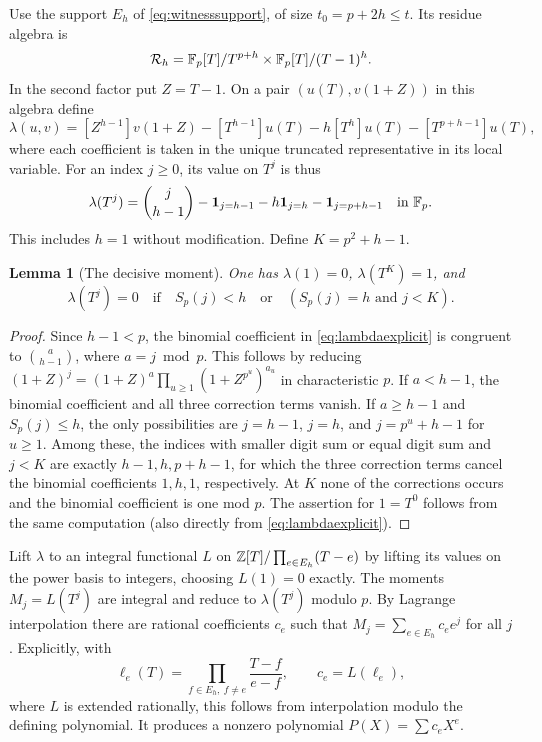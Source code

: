 \documentclass[11pt]{article}
\newtheorem{lemma}[theorem]{Lemma}
\theoremstyle{remark}\newtheorem{remark}[theorem]{Remark}
\begin{document}
Use the support $E_h$ of \eqref{eq:witnesssupport}, of size $t_0=p+2h\le t$.
Its residue algebra is
\[
 \mathcal R_h=\mathbb F_p[T]/T^{p+h}\times\mathbb F_p[T]/(T-1)^h.
\]
In the second factor put $Z=T-1$. On a pair $(u(T),v(1+Z))$ in this algebra define
\begin{equation}\label{eq:lambda}
 \lambda(u,v)=[Z^{h-1}]v(1+Z)-[T^{h-1}]u(T)
 -h[T^h]u(T)-[T^{p+h-1}]u(T),
\end{equation}
where each coefficient is taken in the unique truncated representative in its local
variable. For an index $j\ge0$, its value on $T^j$ is thus
\begin{equation}\label{eq:lambdaexplicit}
 \lambda(T^j)=\binom{j}{h-1}-\mathbf1_{j=h-1}
 -h\mathbf1_{j=h}-\mathbf1_{j=p+h-1}\quad\text{in }\mathbb F_p.
\end{equation}
This includes $h=1$ without modification. Define $K=p^2+h-1$.

\begin{lemma}[The decisive moment]\label{lem:decisive}
One has $\lambda(1)=0$, $\lambda(T^K)=1$, and
\[
 \lambda(T^j)=0\quad\text{if}\quad
 S_p(j)<h\quad\text{or}\quad(S_p(j)=h\text{ and }j<K).
\]
\end{lemma}
\begin{proof}
Since $h-1<p$, the binomial coefficient in \eqref{eq:lambdaexplicit} is congruent
to $\binom{a}{h-1}$, where $a=j\bmod p$. This follows by reducing
$(1+Z)^j=(1+Z)^a\prod_{u\ge1}(1+Z^{p^u})^{a_u}$ in characteristic $p$.
If $a<h-1$, the binomial coefficient and all three correction terms vanish.
If $a\ge h-1$ and $S_p(j)\le h$, the only possibilities are
$j=h-1$, $j=h$, and $j=p^u+h-1$ for $u\ge1$.
Among these, the indices with smaller digit sum or equal digit sum and $j<K$ are
exactly $h-1,h,p+h-1$, for which the three correction terms cancel the binomial
coefficients $1,h,1$, respectively. At $K$ none of the corrections occurs and the
binomial coefficient is one mod $p$. The assertion for $1=T^0$ follows from the
same computation (also directly from \eqref{eq:lambdaexplicit}).
\end{proof}

Lift $\lambda$ to an integral functional $L$ on
$\mathbb Z[T]/\prod_{e\in E_h}(T-e)$ by lifting its values on the power basis to integers,
choosing $L(1)=0$ exactly. The moments $M_j=L(T^j)$ are integral and reduce to
$\lambda(T^j)$ modulo $p$. By Lagrange interpolation there are rational coefficients
$c_e$ such that $M_j=\sum_{e\in E_h}c_e e^j$ for all $j$. Explicitly, with
\[
 \ell_e(T)=\prod_{f\in E_h,\ f\ne e}\frac{T-f}{e-f},
 \qquad c_e=L(\ell_e),
\]
where $L$ is extended rationally, this follows from interpolation modulo the defining
polynomial. It produces a nonzero polynomial $P(X)=\sum c_e X^e$.
\end{document}
